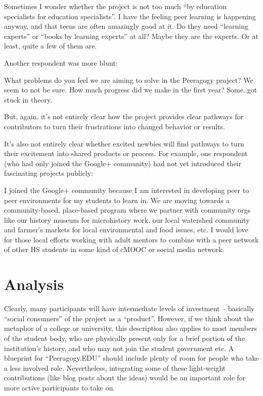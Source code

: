 \documentclass{acm_proc_article-sp}
\begin{document}
Sometimes I wonder whether the project is not too much ``by education specialists for education specialists''. I have the feeling peer learning is happening anyway, and that teens are often amazingly good at it. Do they need ``learning experts'' or ``books by learning experts'' at all? Maybe they are the experts. Or at least, quite a few of them are.

Another respondent was more blunt:

What problems do you feel we are aiming to solve in the Peeragogy project? We seem to not be sure. How much progress did we make in the first year? Some..got stuck in theory.

But, again, it's not entirely clear how the project provides clear pathways for contributors to turn their frustrations into changed behavior or results.

It's also not entirely clear whether excited newbies will find pathways to turn their excitement into shared products or process. For example, one respondent (who had only joined the Google+ community) had not yet introduced their fascinating projects publicly:

I joined the Google+ community because I am interested in developing peer to peer environments for my students to learn in. We are moving towards a community-based, place-based program where we partner with community orgs like our history museum for microhistory work, our local watershed community and farmer's markets for local environmental and food issues, etc. I would love for those local efforts working with adult mentors to combine with a peer network of other HS students in some kind of cMOOC or social media network.

\section{Analysis}

Clearly, many participants will have intermediate levels of investment -- basically ``social consumers'' of the project as a ``product''. However, if we think about the metaphor of a college or university, this description also applies to most members of the student body, who are physically present only for a brief portion of the institution's history, and who may not join the student government etc. A blueprint for ``Peeragogy.EDU'' should include plenty of room for people who take a less involved role. Nevertheless, integrating some of these light-weight contributions (like blog posts about the ideas) would be an important role for more active participants to take on.
\end{document}
